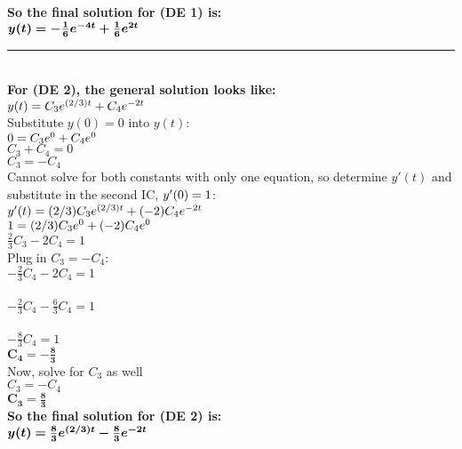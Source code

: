 \documentclass{article}
\begin{document}
\begin{enumerate}
\begin{enumerate}
\textbf{So the final solution for (DE 1) is:}\\
$\bm{y(t) = -\frac{1}{6}e\sp{-4t} + \frac{1}{6}e\sp{2t}}$\\

\rule{15cm}{2pt}\\
\textbf{For (DE 2), the general solution looks like:}\\
$y(t) = C_{3}e\sp{(2/3)t} + C_{4}e\sp{-2t}$\\
Substitute $y(0)=0$ into $y(t)$:\\
$0 = C_{3}e\sp{0} + C_{4}e\sp{0}$\\
$C_{3} + C_{4}=0$\\
$C_{3}= -C_{4}$\\

Cannot solve for both constants with only one equation, so determine $y\prime(t)$ and substitute in the second IC, $y\sp\prime(0)=1$:\\
$y\sp\prime(t) = (2/3)C_{3}e\sp{(2/3)t} + (-2)C_{4}e\sp{-2t}$\\
$1 = (2/3)C_{3}e\sp{0} + (-2)C_{4}e\sp{0}$\\
$\frac{2}{3}C_{3} - 2C_{4} = 1$\\

Plug in $C_{3}= -C_{4}$:\\
$-\frac{2}{3}C_{4} - 2C_{4} = 1$\\\\
$-\frac{2}{3}C_{4} - \frac{6}{3}C_{4} = 1$\\\\
$-\frac{8}{3}C_{4}= 1$\\
$\bm{C_{4}= -\frac{8}{3}}$\\

Now, solve for $C_{3}$ as well\\
$C_{3}= -C_{4}$\\
$\bm{C_{3}= \frac{8}{3}}$\\

\textbf{So the final solution for (DE 2) is:}\\
$\bm{y(t) = \frac{8}{3}e\sp{(2/3)t} - \frac{8}{3}e\sp{-2t}}$\\

\end{enumerate}



\end{enumerate}
\end{document}
